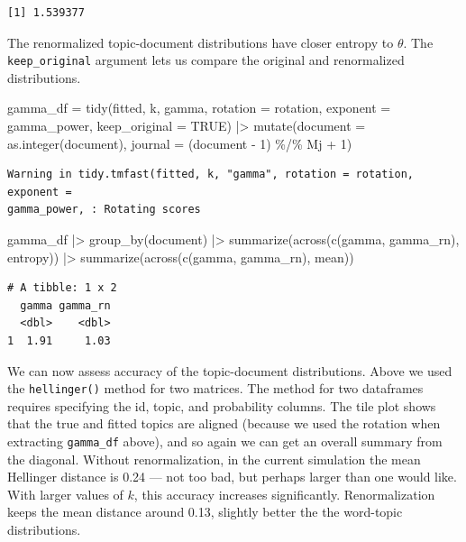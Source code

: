 \documentclass[
]{article}
\newenvironment{Shaded}{\begin{snugshade}}{\end{snugshade}}
\newcommand{\AttributeTok}[1]{\textcolor[rgb]{0.40,0.45,0.13}{#1}}
\newcommand{\ConstantTok}[1]{\textcolor[rgb]{0.56,0.35,0.01}{#1}}
\newcommand{\DecValTok}[1]{\textcolor[rgb]{0.68,0.00,0.00}{#1}}
\newcommand{\FunctionTok}[1]{\textcolor[rgb]{0.28,0.35,0.67}{#1}}
\newcommand{\NormalTok}[1]{\textcolor[rgb]{0.00,0.23,0.31}{#1}}
\newcommand{\OtherTok}[1]{\textcolor[rgb]{0.00,0.23,0.31}{#1}}
\newcommand{\SpecialCharTok}[1]{\textcolor[rgb]{0.37,0.37,0.37}{#1}}
\newcommand{\StringTok}[1]{\textcolor[rgb]{0.13,0.47,0.30}{#1}}
\begin{document}
\begin{verbatim}
[1] 1.539377
\end{verbatim}

The renormalized topic-document distributions have closer entropy to
\(\theta\). The \texttt{keep\_original} argument lets us compare the
original and renormalized distributions.

\begin{Shaded}
\begin{Highlighting}[]
\NormalTok{gamma\_df }\OtherTok{=} \FunctionTok{tidy}\NormalTok{(fitted, k, }\StringTok{\textquotesingle{}gamma\textquotesingle{}}\NormalTok{, }
                \AttributeTok{rotation =}\NormalTok{ rotation, }
                \AttributeTok{exponent =}\NormalTok{ gamma\_power, }
                \AttributeTok{keep\_original =} \ConstantTok{TRUE}\NormalTok{) }\SpecialCharTok{|\textgreater{}} 
    \FunctionTok{mutate}\NormalTok{(}\AttributeTok{document =} \FunctionTok{as.integer}\NormalTok{(document),}
           \AttributeTok{journal =}\NormalTok{ (document }\SpecialCharTok{{-}} \DecValTok{1}\NormalTok{) }\SpecialCharTok{\%/\%}\NormalTok{ Mj }\SpecialCharTok{+} \DecValTok{1}\NormalTok{)}
\end{Highlighting}
\end{Shaded}

\begin{verbatim}
Warning in tidy.tmfast(fitted, k, "gamma", rotation = rotation, exponent =
gamma_power, : Rotating scores
\end{verbatim}

\begin{Shaded}
\begin{Highlighting}[]
\NormalTok{gamma\_df }\SpecialCharTok{|\textgreater{}} 
    \FunctionTok{group\_by}\NormalTok{(document) }\SpecialCharTok{|\textgreater{}} 
    \FunctionTok{summarize}\NormalTok{(}\FunctionTok{across}\NormalTok{(}\FunctionTok{c}\NormalTok{(gamma, gamma\_rn), entropy)) }\SpecialCharTok{|\textgreater{}} 
    \FunctionTok{summarize}\NormalTok{(}\FunctionTok{across}\NormalTok{(}\FunctionTok{c}\NormalTok{(gamma, gamma\_rn), mean))}
\end{Highlighting}
\end{Shaded}

\begin{verbatim}
# A tibble: 1 x 2
  gamma gamma_rn
  <dbl>    <dbl>
1  1.91     1.03
\end{verbatim}

We can now assess accuracy of the topic-document distributions. Above we
used the \texttt{hellinger()} method for two matrices. The method for
two dataframes requires specifying the id, topic, and probability
columns. The tile plot shows that the true and fitted topics are aligned
(because we used the rotation when extracting \texttt{gamma\_df} above),
and so again we can get an overall summary from the diagonal. Without
renormalization, in the current simulation the mean Hellinger distance
is 0.24 --- not too bad, but perhaps larger than one would like. With
larger values of \(k\), this accuracy increases significantly.
Renormalization keeps the mean distance around 0.13, slightly better the
the word-topic distributions.
\end{document}
